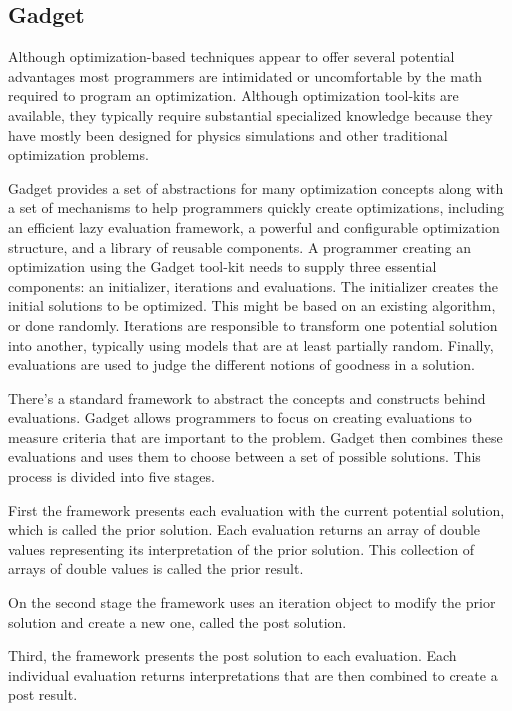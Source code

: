 \subsection{Gadget}
\label{subsection:GADGET}

Although optimization-based techniques appear to offer several potential advantages most programmers are intimidated or uncomfortable by the math required to program an optimization. Although optimization tool-kits are available, they typically require substantial specialized knowledge because they have mostly been designed for physics simulations and other traditional optimization problems.

Gadget provides a set of abstractions for many optimization concepts along with a set of mechanisms to help programmers quickly create optimizations, including an efficient lazy evaluation framework, a powerful and configurable optimization structure, and a library of reusable components.
A programmer creating an optimization using the Gadget tool-kit needs to supply three essential components: an initializer, iterations and evaluations. The initializer creates the initial solutions to be optimized. This might be based on an existing algorithm, or done randomly. Iterations are responsible to transform one potential solution into another, typically using models that are at least partially random. Finally, evaluations are used to judge the different notions of goodness in a solution.

There’s a standard framework to abstract the concepts and constructs behind evaluations. Gadget allows programmers to focus on creating evaluations to measure criteria that are important to the problem. Gadget then combines these evaluations and uses them to choose between a set of possible solutions. This process is divided into five stages. 

First the framework presents each evaluation with the current potential solution, which is called the prior solution. Each evaluation returns an array of double values representing its interpretation of the prior solution. This collection of arrays of double values is called the prior result. 

On the second stage the framework uses an iteration object to modify the prior solution and create a new one, called the post solution.

Third, the framework presents the post solution to each evaluation. Each individual evaluation returns interpretations that are then combined to create a post result.

